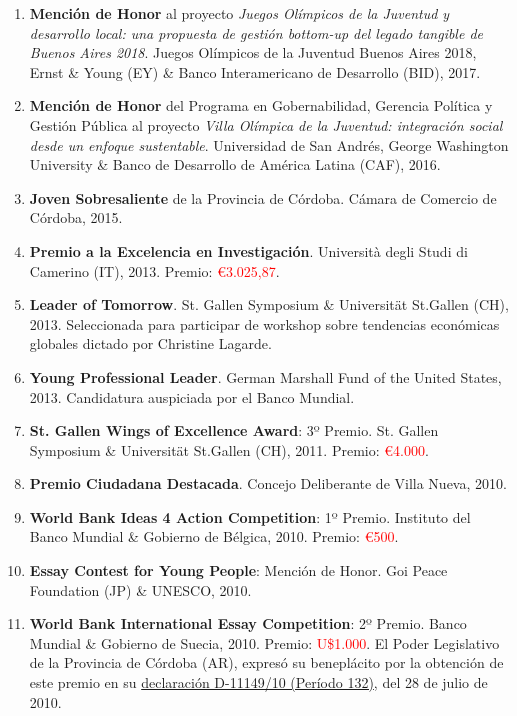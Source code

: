 \documentclass[12pt]{article}
\begin{document}
\begin{enumerate}

\item {\bf Mención de Honor} al proyecto {\it Juegos Olímpicos de la Juventud y desarrollo local: una propuesta de gestión bottom-up del legado tangible de Buenos Aires 2018}. Juegos Olímpicos de la Juventud Buenos Aires 2018, Ernst & Young (EY) \& Banco Interamericano de Desarrollo (BID), 2017. 

\item {\bf Mención de Honor} del Programa en Gobernabilidad, Gerencia Política y Gestión Pública al proyecto {\it Villa Olímpica de la Juventud: integración social desde un enfoque sustentable}. Universidad de San Andrés, George Washington University \& Banco de Desarrollo de América Latina (CAF), 2016. 

\item {\bf Joven Sobresaliente} de la Provincia de Córdoba. Cámara de Comercio de Córdoba, 2015.

\item {\bf Premio a la Excelencia en Investigación}. Università degli Studi di Camerino (IT), 2013. Premio: \textcolor{red}{€3.025,87}.

\item {\bf Leader of Tomorrow}. St. Gallen Symposium \& Universität St.Gallen (CH), 2013. Seleccionada para participar de workshop sobre tendencias económicas globales dictado por Christine Lagarde.

\item {\bf Young Professional Leader}. German Marshall Fund of the United States, 2013. Candidatura auspiciada por el Banco Mundial. 

\item {\bf St. Gallen Wings of Excellence Award}: 3º Premio. St. Gallen Symposium \& Universität St.Gallen (CH), 2011. Premio: \textcolor{red}{€4.000}.

\item {\bf Premio Ciudadana Destacada}. Concejo Deliberante de Villa Nueva, 2010.

\item {\bf World Bank Ideas 4 Action Competition}: 1º Premio. Instituto del Banco Mundial \& Gobierno de Bélgica, 2010. Premio: \textcolor{red}{€500}.

\item {\bf Essay Contest for Young People}: Mención de Honor. Goi Peace Foundation (JP) \& UNESCO, 2010. 

\item {\bf World Bank International Essay Competition}: 2º Premio. Banco Mundial \& Gobierno de Suecia, 2010. Premio: \textcolor{red}{U\$1.000}. El Poder Legislativo de la Provincia de Córdoba (AR), expresó su beneplácito por la obtención de este premio en su \href{http://datos.legiscba.gob.ar/contenidos/themes/Legislatura-th01/descarga_documento.php}{declaración D-11149/10 (Período 132)}, del 28 de julio de 2010.


\end{enumerate}
\end{document}
